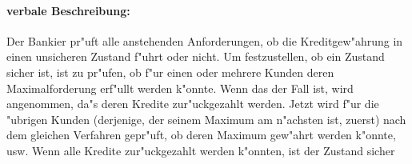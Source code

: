 \documentclass[titlepage,12pt, bibtotoc, liststotoc]{scrreprt}
\begin{document}
\paragraph{verbale Beschreibung:}
Der Bankier pr"uft alle anstehenden Anforderungen, ob die Kreditgew"ahrung in
einen unsicheren Zustand f"uhrt oder nicht.
Um festzustellen, ob ein Zustand sicher ist, ist zu pr"ufen, ob f"ur einen oder
mehrere Kunden deren Maximalforderung erf"ullt werden k"onnte.
Wenn das der Fall ist, wird angenommen, da"s deren Kredite zur"uckgezahlt werden.
Jetzt wird f"ur die "ubrigen Kunden (derjenige, der seinem Maximum am n"achsten
ist, zuerst) nach dem gleichen Verfahren gepr"uft, ob deren Maximum gew"ahrt
werden k"onnte, usw.
Wenn alle Kredite zur"uckgezahlt werden k"onnten, ist der Zustand sicher
 
\end{document}
